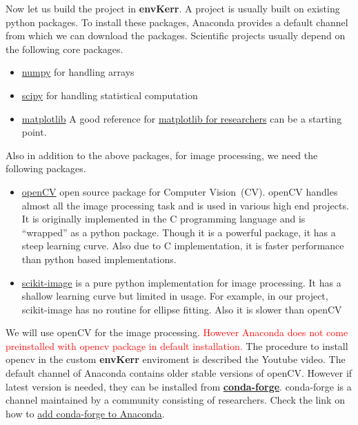 \documentclass[12pt, twoside, a4paper]{article}
\begin{document}
Now let us build the project in \textbf{envKerr}. A project is usually built on existing python packages. To install these packages, Anaconda provides a default channel from which we can download the packages. Scientific projects usually depend on the following core packages.
\begin{itemize}
	\item \href{https://docs.scipy.org/doc/numpy-1.13.0/reference/arrays.indexing.html#}{numpy} for handling arrays
	\item \href{https://docs.scipy.org/doc/scipy/reference/optimize.html}{scipy} for handling statistical computation
	\item \href{https://matplotlib.org/}{matplotlib} A good reference for  \href{https://github.com/rougier/matplotlib-tutorial}{matplotlib for researchers} can be a starting point.
\end{itemize}

Also in addition to the above packages, for image processing, we need the following packages.
\begin{itemize}
	\item \href{https://docs.opencv.org/trunk/d6/d00/tutorial_py_root.html}{openCV} open source package for Computer Vision~(CV). openCV handles almost all the image processing task and is used in various high end projects. It is originally implemented in the C programming language and is ``wrapped'' as a python package. Though it is a powerful package, it has a steep learning curve. Also due to C implementation, it is faster performance than python based implementations.
	\item \href{https://scikit-image.org/docs/dev/index.html}{scikit-image} is a pure python implementation for image processing. It has a shallow learning curve but limited in usage. For example, in our project, scikit-image has no routine for ellipse fitting. Also it is slower than openCV
\end{itemize}
We will use openCV for the image processing. \textcolor{red}{However Anaconda does not come preinstalled with opencv package in default installation.}  The procedure to install opencv in the custom \textbf{envKerr} enviroment is described the Youtube video. The default channel of Anaconda contains older stable versions of openCV. However if latest version is needed, they can be installed from \href{https://github.com/conda-forge}{\textbf{conda-forge}}. conda-forge is a channel maintained by a community consisting of researchers. Check the link on how to  \href{https://docs.anaconda.com/anaconda/navigator/tutorials/manage-channels/#adding-a-channel}{add conda-forge to Anaconda}. 
\end{document}
